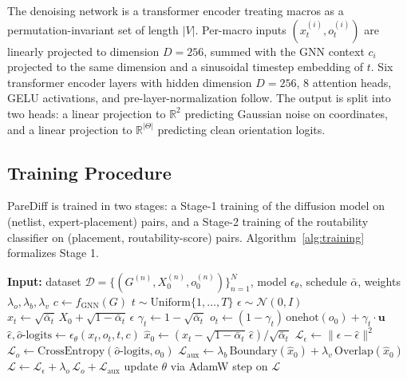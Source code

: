 \documentclass[lettersize,journal]{IEEEtran}
\begin{document}
The denoising network is a transformer encoder treating macros as a permutation-invariant set of length $|V|$. Per-macro inputs $(x_t^{(i)}, o_t^{(i)})$ are linearly projected to dimension $D = 256$, summed with the GNN context $c_i$ projected to the same dimension and a sinusoidal timestep embedding of $t$. Six transformer encoder layers with hidden dimension $D = 256$, 8 attention heads, GELU activations, and pre-layer-normalization follow. The output is split into two heads: a linear projection to $\mathbb{R}^2$ predicting Gaussian noise on coordinates, and a linear projection to $\mathbb{R}^{|\Theta|}$ predicting clean orientation logits.

\subsection{Training Procedure}

PareDiff is trained in two stages: a Stage-1 training of the diffusion model on (netlist, expert-placement) pairs, and a Stage-2 training of the routability classifier on (placement, routability-score) pairs. Algorithm~\ref{alg:training} formalizes Stage 1.

\begin{algorithm}[!t]
\caption{PareDiff Stage-1 Training (Diffusion).}\label{alg:training}
\begin{algorithmic}
\STATE \textbf{Input:} dataset $\mathcal{D} = \{(G^{(n)}, X^{(n)}_0, o^{(n)}_0)\}_{n=1}^N$, model $\epsilon_\theta$, schedule $\bar{\alpha}$, weights $\lambda_o, \lambda_b, \lambda_v$
        \STATE $c \gets f_\text{GNN}(G)$
        \STATE $t \sim \text{Uniform}\{1, \dots, T\}$
        \STATE $\epsilon \sim \mathcal{N}(0, I)$
        \STATE $x_t \gets \sqrt{\bar{\alpha}_t}\, X_0 + \sqrt{1-\bar{\alpha}_t}\, \epsilon$
        \STATE $\gamma_t \gets 1 - \sqrt{\bar{\alpha}_t}$
        \STATE $o_t \gets (1-\gamma_t)\, \text{onehot}(o_0) + \gamma_t \cdot \mathbf{u}$
        \STATE $\hat\epsilon, \hat{o}\text{-logits} \gets \epsilon_\theta(x_t, o_t, t, c)$
        \STATE $\hat{x}_0 \gets (x_t - \sqrt{1-\bar{\alpha}_t}\,\hat\epsilon) / \sqrt{\bar{\alpha}_t}$
        \STATE $\mathcal{L}_\epsilon \gets \|\epsilon - \hat\epsilon\|^2$
        \STATE $\mathcal{L}_o \gets \text{CrossEntropy}(\hat{o}\text{-logits}, o_0)$
        \STATE $\mathcal{L}_\text{aux} \gets \lambda_b\,\text{Boundary}(\hat{x}_0) + \lambda_v\,\text{Overlap}(\hat{x}_0)$
        \STATE $\mathcal{L} \gets \mathcal{L}_\epsilon + \lambda_o\,\mathcal{L}_o + \mathcal{L}_\text{aux}$
        \STATE update $\theta$ via AdamW step on $\mathcal{L}$
    \ENDFOR
\ENDFOR
\end{algorithmic}
\end{algorithm}
\end{document}
